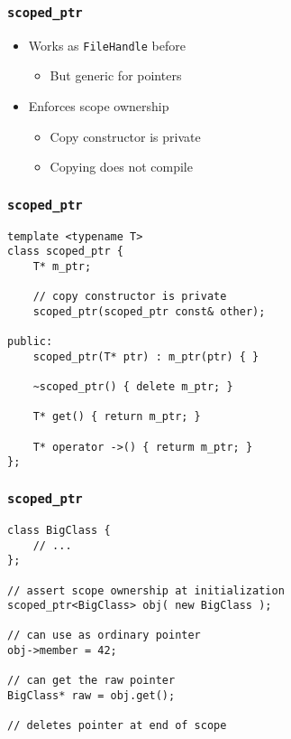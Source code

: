 \begin{frame}
    \frametitle{\texttt{scoped\_ptr}}
    \begin{itemize}
        \item Works as \texttt{FileHandle} before
            \begin{itemize}
                \item But generic for pointers
            \end{itemize}
        \item Enforces scope ownership
            \begin{itemize}
                \item Copy constructor is private
                \item Copying does not compile
            \end{itemize}
    \end{itemize}
\end{frame}

\begin{frame}[fragile]
    \frametitle{\texttt{scoped\_ptr}}
    \begin{lstlisting}[title=Implementation]
template <typename T>
class scoped_ptr {
    T* m_ptr;

    // copy constructor is private
    scoped_ptr(scoped_ptr const& other);

public:
    scoped_ptr(T* ptr) : m_ptr(ptr) { }

    ~scoped_ptr() { delete m_ptr; }

    T* get() { return m_ptr; }

    T* operator ->() { returm m_ptr; }
};
    \end{lstlisting}
\end{frame}

\begin{frame}[fragile]
    \frametitle{\texttt{scoped\_ptr}}
    \begin{lstlisting}[title=Usage]
class BigClass {
    // ...
};

// assert scope ownership at initialization
scoped_ptr<BigClass> obj( new BigClass );

// can use as ordinary pointer
obj->member = 42;

// can get the raw pointer
BigClass* raw = obj.get();

// deletes pointer at end of scope
    \end{lstlisting}
\end{frame}

